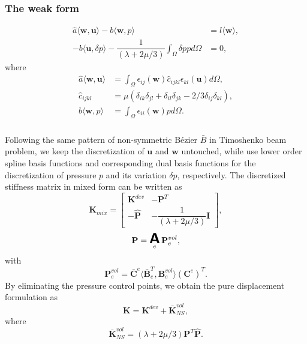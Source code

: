 \documentclass{article}
\DeclareMathOperator*{\A}{ \mathlarger{\mathlarger{\mathlarger{\boldsymbol{\mathsf{A}}}}} }
\newcommand{\Bezier}{{B\'{e}zier} }
\begin{document}
\subsubsection{The weak form}
\begin{align}
    \hat{a}\langle{\mathbf{w},\mathbf{u}}\rangle-b\langle{\mathbf{w},p}\rangle&=l\langle{\mathbf{w}}\rangle, \\
    - b\langle{\mathbf{u},\delta{p}}\rangle-\dfrac{1}{(\lambda+2\mu/3)}\int_{\Omega}\delta{p}pd\Omega&=0,
\end{align}
where
\begin{align}
    \hat{a}\langle{\mathbf{w},\mathbf{u}}\rangle&=\int_{\Omega}\epsilon_{ij}(\mathbf{w})\hat{c}_{ijkl}\epsilon_{kl}(\mathbf{u})d\Omega,\\
    \hat{c}_{ijkl}&=\mu\left(\delta_{ik}\delta_{jl}+\delta_{il}\delta_{jk}-2/3\delta_{ij}\delta_{kl}\right),\\
    b\langle{\mathbf{w},p}\rangle&=\int_{\Omega}\epsilon_{ii}(\mathbf{w})pd\Omega.
\end{align}

\subsubsection{}

Following the same pattern of non-symmetric \Bezier $\bar{B}$ in Timoshenko beam problem, we keep the discretization of $\mathbf{u}$ and $\mathbf{w}$ untouched, while use lower order spline basis functions and corresponding dual basis functions for the discretization of pressure $p$ and its variation $\delta{p}$, respectively. The discretized stiffness matrix in mixed form can be written as
\begin{equation}
    \mathbf{K}_{mix}=
    \begin{bmatrix}
        \mathbf{K}^{dev} & -\mathbf{P}^{T}\\
        -\hat{\mathbf{P}} & -\dfrac{1}{(\lambda+2\mu/3)}\mathbf{I}
    \end{bmatrix},
\end{equation}
\begin{equation}
    \mathbf{P}=\A_e\mathbf{P}_e^{vol},
\end{equation}
with
\begin{equation}
    \mathbf{P}_e^{vol}=\bar{\mathbf{C}}^e\langle{\bar{\mathbf{B}}_e^T,\mathbf{B}^{vol}_e}\rangle(\mathbf{C}^e)^T.
\end{equation}
By eliminating the pressure control points, we obtain the pure displacement formulation as
\begin{equation}
	\mathbf{K} = \mathbf{K}^{dev} + \bar{\mathbf{K}}^{vol}_{NS},
\end{equation}
where
\begin{equation}
    \bar{\mathbf{K}}^{vol}_{NS}=(\lambda+2\mu/3){\mathbf{P}}^T\hat{\mathbf{P}}.
\end{equation}
\end{document}
